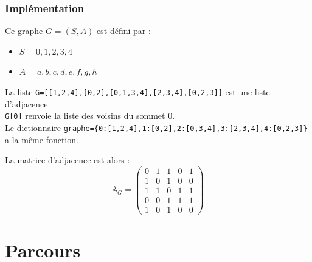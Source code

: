 \begin{frame}[fragile]
\frametitle{Implémentation}
\begin{minipage}[l]{0.25\linewidth}
\end{minipage}
\begin{minipage}[l]{0.7\linewidth}
Ce graphe $G=(S,A)$ est défini par :
\begin{itemize}
\item $S={0,1,2,3,4}$
\item $A={a, b, c, d, e, f, g, h}$
\end{itemize}
\end{minipage}

La liste \verb?G=[[1,2,4],[0,2],[0,1,3,4],[2,3,4],[0,2,3]]? est une liste d'adjacence.\\
\verb?G[0]? renvoie la liste des voisins du sommet 0.\\
Le dictionnaire \verb?graphe={0:[1,2,4],1:[0,2],2:[0,3,4],3:[2,3,4],4:[0,2,3]}? a la même fonction.

La matrice d'adjacence est alors :
$$\mathbb{A}_G=
\begin{pmatrix}
0 & 1 & 1 & 0 & 1 \\
1 & 0 & 1 & 0 & 0 \\
1 & 1 & 0 & 1 & 1 \\
0 & 0 & 1 & 1 & 1 \\
1 & 0 & 1 & 0 & 0  
\end{pmatrix}$$

\end{frame}

\section{Parcours}

